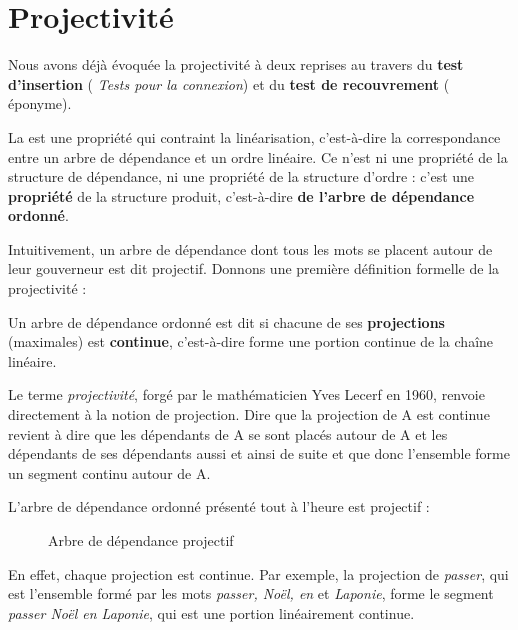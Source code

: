 \section{Projectivité}\label{sec:3.5.14}

Nous avons déjà évoquée la projectivité à deux reprises au travers du \textbf{test d’insertion} ( \textit{Tests pour la connexion}) et du \textbf{test de recouvrement} ( éponyme).

La  est une propriété qui contraint la linéarisation, c’est-à-dire la correspondance entre un arbre de dépendance et un ordre linéaire. Ce n’est ni une propriété de la structure de dépendance, ni une propriété de la structure d’ordre : c’est une \textbf{propriété} de la structure produit, c’est-à-dire \textbf{de l’arbre} \textbf{de dépendance ordonné}.

Intuitivement, un arbre de dépendance dont tous les mots se placent autour de leur gouverneur est dit projectif. Donnons une première définition formelle de la projectivité :

\begin{styleLivreImportant}
Un arbre de dépendance ordonné est dit  si chacune de ses \textbf{projections} (maximales) est \textbf{continue}, c’est-à-dire forme une portion continue de la chaîne linéaire.
\end{styleLivreImportant}

Le terme \textit{projectivité}, forgé par le mathématicien Yves Lecerf en 1960, renvoie directement à la notion de projection. Dire que la projection de A est continue revient à dire que les dépendants de A se sont placés autour de A et les dépendants de ses dépendants aussi et ainsi de suite et que donc l’ensemble forme un segment continu autour de A.

L’arbre de dépendance ordonné présenté tout à l’heure est projectif :

\begin{figure}

\caption{\label{fig:}Arbre de dépendance projectif}

\end{figure}

En effet, chaque projection est continue. Par exemple, la projection de \textit{passer}, qui est l’ensemble formé par les mots \textit{passer, Noël, en} et \textit{Laponie}, forme le segment \textit{passer Noël en Laponie}, qui est une portion linéairement continue.

